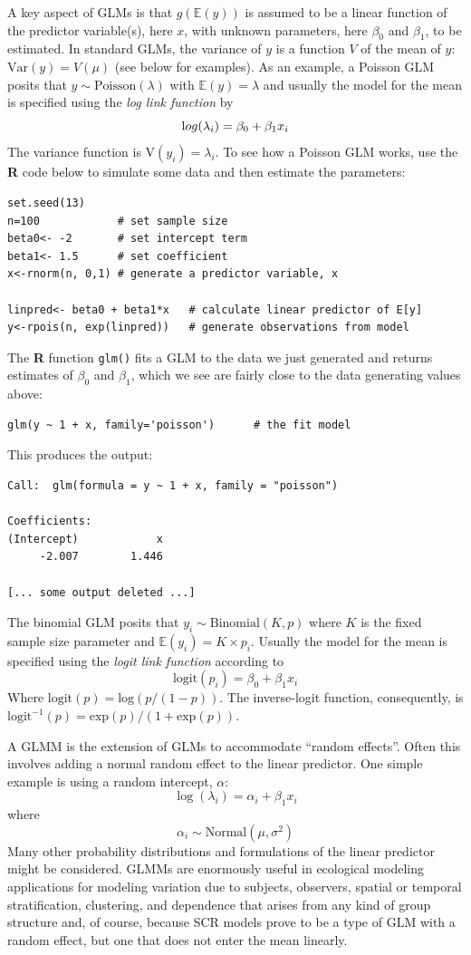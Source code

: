 A key aspect of GLMs is that 
$g(\mathbb{E}(y))$ is assumed to be a linear function of the
predictor variable(s), here $x$, with unknown parameters, here $\beta_0$ and $\beta_1$, to be
estimated. In standard GLMs,
the variance of $y$ is a function $V$ of the mean of $y$: $\mbox{Var}(y) =
V(\mu)$ (see below for examples).
As an example, a Poisson GLM posits that $y \sim \mbox{Poisson}(\lambda)$ with $\mathbb{E}(y)
=\lambda$ and usually the model for the mean is specified using the
{\it log link function} by
\[
{\text log}(\lambda_{i}) = \beta_0 + \beta_{1}  x_{i}
\]
The variance function is $\mbox{V}(y_{i}) = \lambda_{i}$.  
To see how a Poisson GLM works, use the {\bf R} code below to simulate
some data and then estimate the parameters:
\begin{verbatim}
set.seed(13)
n=100            # set sample size
beta0<- -2       # set intercept term
beta1<- 1.5      # set coefficient
x<-rnorm(n, 0,1) # generate a predictor variable, x

linpred<- beta0 + beta1*x   # calculate linear predictor of E[y]
y<-rpois(n, exp(linpred))   # generate observations from model
\end{verbatim} 
The {\bf R} function {\tt glm()} fits a GLM to the data we just
generated and returns estimates of $\beta_0$ and $\beta_1$, which we
see are fairly close to the data generating values above:
\begin{verbatim}
glm(y ~ 1 + x, family='poisson')      # the fit model
\end{verbatim}
This produces the output:
\begin{verbatim}
Call:  glm(formula = y ~ 1 + x, family = "poisson")

Coefficients:
(Intercept)            x  
     -2.007        1.446  

[... some output deleted ...]
\end{verbatim}

The
binomial GLM posits that $y_{i} \sim \mbox{Binomial}(K,p)$ where $K$
is the fixed sample size parameter and $\mathbb{E}(y_{i}) = K \times p_{i}$. Usually
the model for the mean is specified using the {\it logit link
  function} according to
\[
 \text {logit}(p_{i}) = \beta_{0} + \beta_{1}  x_{i}
\]
Where $\text {logit}(p) = \text {log}(p/(1-p))$.  The inverse-logit function,
consequently, is $\text {logit}^{-1}(p) =
\text {exp}(p)/(1+\text {exp}(p))$.

A GLMM is the extension of GLMs to accommodate ``random
effects''. Often this involves adding a normal random effect to the
linear predictor. One simple example is using a random intercept, $\alpha$:
\[
 \log(\lambda_{i}) = \alpha_{i} + \beta_{1} x_{i}
\]
where
\[
 \alpha_{i} \sim \mbox{Normal}(\mu,\sigma^{2})
\]
Many other probability distributions and formulations of the linear
predictor might be considered.  GLMMs are enormously useful in
ecological modeling applications for modeling variation due to 
subjects, observers, spatial
or temporal stratification, clustering, and dependence that arises
from any kind of group structure and, of course, because SCR models
prove to be a type of GLM with a random effect, but one that does not
enter the mean linearly. 

